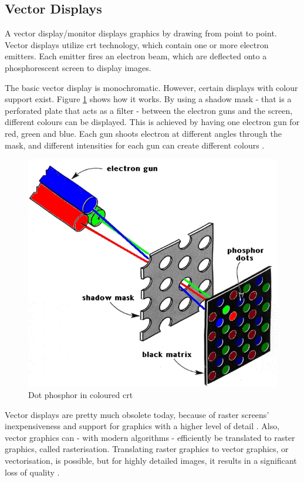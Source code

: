 \subsection{Vector Displays}
A vector display/monitor displays graphics by drawing from point to point.
Vector displays utilize \gls{crt} technology, which contain one or more electron emitters. Each emitter fires an electron beam, which are deflected onto a phosphorescent screen to display images.

The basic vector display is monochromatic.
However, certain displays with colour support exist.
Figure \ref{fig:color_crt} shows how it works.
By using a shadow mask - that is a perforated plate that acts as a filter - between the electron guns and the screen, different colours can be displayed.
This is achieved by having one electron gun for red, green and blue.
Each gun shoots electron at different angles through the mask, and different intensities for each gun can create different colours \cite{monitors}.

\begin{figure}
	\centering
	\includegraphics[width=0.5 \textwidth]{images/color_crt.jpg}
	\caption{Dot phosphor in coloured \gls{crt} \cite{monitors}}
	\label{fig:color_crt}
\end{figure}

Vector displays are pretty much obsolete today, because of raster screens' inexpensiveness and support for graphics with a higher level of detail \cite{lcd-vs-crt}.
Also, vector graphics can - with modern algorithms - efficiently be translated to raster graphics, called rasterisation.
Translating raster graphics to vector graphics, or vectorisation, is possible, but for highly detailed images, it results in a significant loss of quality \cite{vectorisation}.
